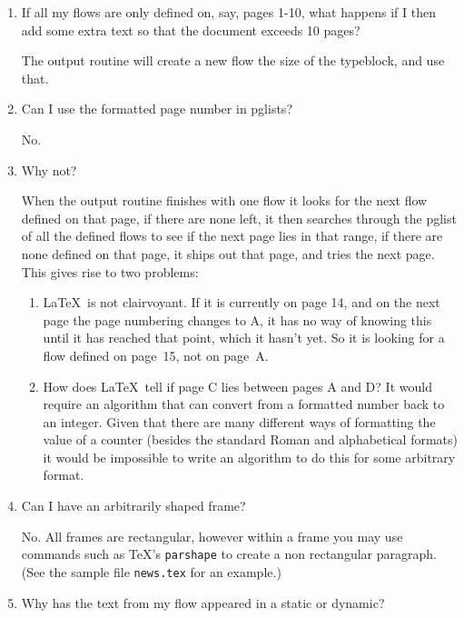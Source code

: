 \documentclass[a4paper,twoside]{book}
\makeatletter
\newcommand{\cmdname}[1]{\texttt{\symbol{92}#1}\index{#1@\texttt{\symbol{92}#1}}}
\newcounter{N}
\newcounter{I}
\makeatother
\begin{document}
\begin{enumerate}
\item If all my \gls{flow}s are only defined on, say, 
pages 1-10, what happens if I then add some extra text so that
the document exceeds 10 pages?

The output routine will create a new \gls{flow} the size 
of the \gls{typeblock}, and use that.

\item Can I use the formatted page number in \gls{pglist}s?

No.

\item\label{itm:whynot} Why not?

When the output routine finishes with one \gls{flow}
it looks for the next \gls{flow} defined on that page,
if there are none left, it then searches through the \gls{pglist}
of all the defined \gls{flow}s to see if the next page 
lies in that range, if there are none defined on that page,
it ships out that page, and tries the next page. 
This gives rise to two problems:

\begin{enumerate}
\item \LaTeX\ is not clairvoyant. If it is currently
on page 14, and on the next page the page numbering changes
to A, it has no way of knowing this until it has reached
that point, which it hasn't yet. So it is looking for a 
\gls{flow} defined on page~15, not on page~A.

\item How does \LaTeX\ tell if page C lies between 
pages A and D? It would require an algorithm that can convert
from a formatted number back to an integer. Given that there
are many different ways of formatting the value of a counter
(besides the standard Roman and alphabetical formats) it
would be impossible to write an algorithm to do this
for some arbitrary format.
\end{enumerate}

\item Can I have an arbitrarily shaped \gls{frame}?
\label{itm:parshape}

No. All frames are rectangular, however within a frame 
you may use commands such as \TeX's \cmdname{parshape} to
create a non rectangular paragraph. (See the sample file
\texttt{news.tex} for an example.)

\item Why has the text from my \gls{flow} appeared in a
\gls{static} or \gls{dynamic}?


\end{enumerate}
\end{document}
